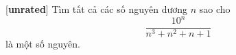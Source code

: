 \documentclass[../01-divisibility.tex]{subfiles}
\begin{document}
\begin{exercise*}\label{example:JPN-2015-MO-P1}[\textbf{unrated}]
	Tìm tất cả các số nguyên dương \( n \) sao cho 
	\[
		\frac{10^n}{n^3 + n^2 + n + 1}
	\]
	là một số nguyên.
\end{exercise*}
\end{document}
